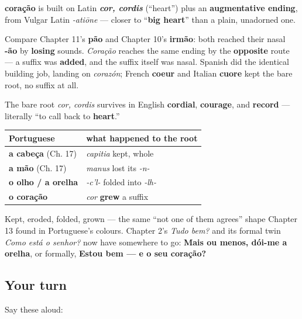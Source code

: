 \begin{cousinweb}
\textbf{coração} is built on Latin \emph{\textbf{cor, cordis}} (\textquotedblleft{}heart\textquotedblright{}) plus an \textbf{augmentative ending}, from Vulgar Latin \emph{-atiōne} — closer to \textquotedblleft{}\textbf{big heart}\textquotedblright{} than a plain, unadorned one.

Compare Chapter 11's \textbf{pão} and Chapter 10's \textbf{irmão}: both reached their nasal \textbf{-ão} by \textbf{losing} sounds. \emph{Coração} reaches the same ending by the \textbf{opposite} route — a suffix was \textbf{added}, and the suffix itself was nasal. Spanish did the identical building job, landing on \emph{corazón}; French \textbf{coeur} and Italian \textbf{cuore} kept the bare root, no suffix at all.

The bare root \emph{cor, cordis} survives in English \textbf{cordial}, \textbf{courage}, and \textbf{record} — literally \textquotedblleft{}to call back to \textbf{heart}.\textquotedblright{}
\end{cousinweb}

\begin{grammarlens}[title={What you've built: The chapter in one table}]
\noindent
\begin{tabularx}{\linewidth}{@{}>{\raggedright\arraybackslash}X>{\raggedright\arraybackslash}X@{}}
\toprule
\textbf{Portuguese} & \textbf{what happened to the root} \\
\midrule
\textbf{a cabeça} (Ch. 17) & \emph{capitia} kept, whole \\
\textbf{a mão} (Ch. 17) & \emph{manus} lost its \emph{-n-} \\
\textbf{o olho / a orelha} & \emph{-c'l-} folded into \emph{-lh-} \\
\textbf{o coração} & \emph{cor} \textbf{grew} a suffix \\
\bottomrule
\end{tabularx}

Kept, eroded, folded, grown — the same \textquotedblleft{}not one of them agrees\textquotedblright{} shape Chapter 13 found in Portuguese's colours. Chapter 2's \emph{Tudo bem?} and its formal twin \emph{Como está o senhor?} now have somewhere to go: \textbf{Mais ou menos, dói-me a orelha}, or formally, \textbf{Estou bem — e o seu coração?}
\end{grammarlens}

\subsection*{Your turn}
Say these aloud:

